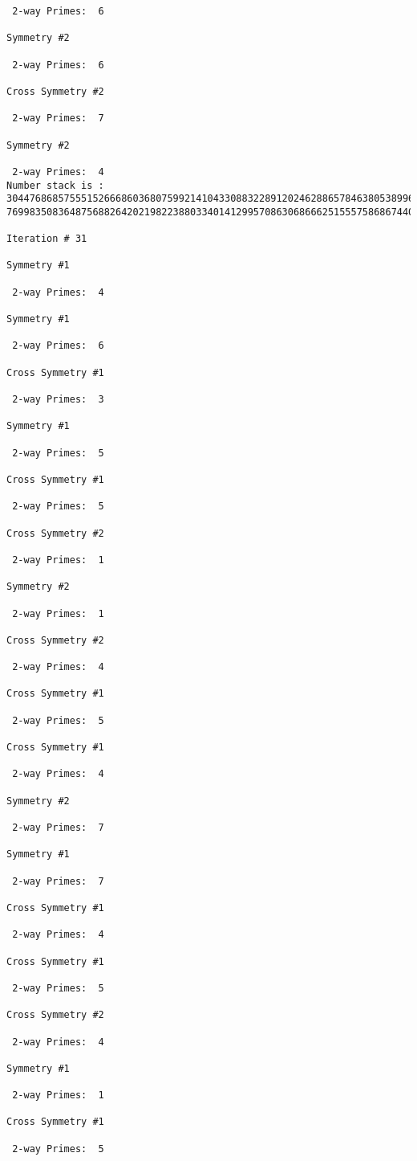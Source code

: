 {{{{\begin{verbatim}
 2-way Primes: 	6

Symmetry #2

 2-way Primes: 	6

Cross Symmetry #2

 2-way Primes: 	7

Symmetry #2

 2-way Primes: 	4
Number stack is :
30447686857555152666860368075992141043308832289120246288657846380538996794608835958544046240163340857
76998350836487568826420219822388033401412995708630686662515557586867440375804336104264044585953880649

Iteration #	31

Symmetry #1

 2-way Primes: 	4

Symmetry #1

 2-way Primes: 	6

Cross Symmetry #1

 2-way Primes: 	3

Symmetry #1

 2-way Primes: 	5

Cross Symmetry #1

 2-way Primes: 	5

Cross Symmetry #2

 2-way Primes: 	1

Symmetry #2

 2-way Primes: 	1

Cross Symmetry #2

 2-way Primes: 	4

Cross Symmetry #1

 2-way Primes: 	5

Cross Symmetry #1

 2-way Primes: 	4

Symmetry #2

 2-way Primes: 	7

Symmetry #1

 2-way Primes: 	7

Cross Symmetry #1

 2-way Primes: 	4

Cross Symmetry #1

 2-way Primes: 	5

Cross Symmetry #2

 2-way Primes: 	4

Symmetry #1

 2-way Primes: 	1

Cross Symmetry #1

 2-way Primes: 	5


\end{verbatim}}}}}
